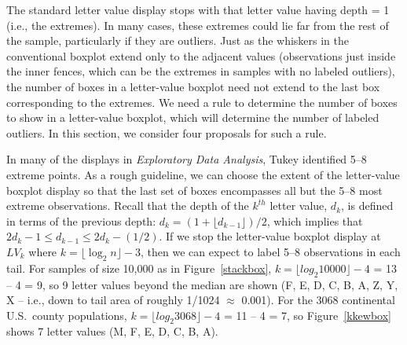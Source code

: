 \documentclass[oneside]{article}
\begin{document}




The standard letter value display stops with that letter value having depth = 1 (i.e., the extremes). In many cases, these extremes could lie far from the rest of the sample, particularly if they are outliers. Just as the whiskers in the conventional boxplot extend only to the adjacent values (observations just inside the inner fences, which can be the extremes in samples with no labeled outliers), the number of boxes in a letter-value boxplot need not extend to the last box corresponding to the extremes. We need a rule to determine the number of boxes to show in a letter-value boxplot, which will determine the number of labeled outliers. In this section, we consider four proposals for such a rule.

In many of the displays in \textit{Exploratory Data Analysis}, Tukey identified 5--8 extreme points. As a rough guideline, we can choose the extent of the letter-value boxplot display so that the last set of boxes encompasses all but the 5--8 most extreme observations. Recall that the depth of the $k^{th}$ letter value, $d_k$, is defined in terms of the previous depth: $d_k = (1 + \lfloor d_{k-1} \rfloor)/2$, which implies that $2 d_{k} -1 \leq d_{k-1} \leq 2 d_k - (1/2)$. If we stop the letter-value boxplot display at $LV_k$ where $k = \lfloor \log_2 n \rfloor - 3$, then we can expect to label 5--8 observations in each tail. For samples of size 10,000 as in Figure~\ref{stackbox}, $k = \lfloor log_2 10000 \rfloor - 4$ = 13 -- 4 = 9, so 9 letter values beyond the median are shown (F, E, D, C, B, A, Z, Y, X -- i.e., down to tail area of roughly 1/1024 $\approx$ 0.001). For the 3068 continental U.S.\ county populations, $k = \lfloor log_2 3068 \rfloor - 4$ = 11 -- 4 = 7, so Figure~\ref{kkewbox} shows 7 letter values (M, F, E, D, C, B, A).
\end{document}
